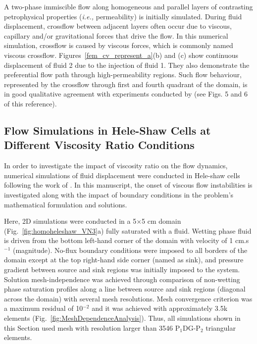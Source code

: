 \documentclass[preprint,authoryear,12pt]{elsarticle}
\newcommand{\PN}[2][error]{P$_{#1}$DG-P$_{#2}$}
\newcommand{\ie}{{\it i.e., }}
\begin{document}
A two-phase immiscible flow along homogeneous and parallel layers of contrasting petrophysical properties (\ie permeability) is initially simulated. During fluid displacement, crossflow between adjacent layers often occur due to viscous, capillary and/or gravitational forces that drive the flow. In this numerical simulation, crossflow is caused by viscous forces, which is commonly named viscous crossflow. Figures~\ref{fem_cv_represent_a}(b) and (c) show continuous displacement of fluid 2 due to the injection of fluid 1. They also demonstrate the preferential flow path through high-permeability regions. Such flow behaviour, represented by the crossflow through first and fourth quadrant of the domain, is in good qualitative agreement with experiments conducted by \citet{dawe_2008} (see Figs. 5 and 6 of this reference).  


\subsection{Flow Simulations in Hele-Shaw Cells at Different Viscosity Ratio Conditions}\label{section:results_homo_hete} 
In order to investigate the impact of viscosity ratio on the flow dynamics, numerical simulations of fluid displacement were conducted in Hele-shaw cells following the work of \citet{saffman_1986}. In this manuscript, the onset of viscous flow instabilities \citep[following his seminal work in][]{saffman_1958} is investigated along with the impact of boundary conditions in the problem's mathematical formulation and solutions. 

\medskip
Here, 2D simulations were conducted in a 5$\times$5 cm domain (Fig.~\ref{fig:homoheleshaw_VN3}a) fully saturated with a fluid. Wetting phase fluid is driven from the bottom left-hand corner of the domain with velocity of 1 cm.s$^{-1}$ (magnitude). No-flux boundary conditions were imposed to all borders of the domain except at the top right-hand side corner (named as sink), and pressure gradient between source and sink regions was initially imposed to the system. Solution mesh-independence was achieved through comparison of non-wetting phase saturation profiles along a line between source and sink regions (diagonal across the domain) with several mesh resolutions. Mesh convergence criterion was a maximum residual of 10$^{-2}$ and it was achieved with approximately 3.5k elements (Fig.~\ref{fig:MeshDependenceAnalysis}). Thus, all simulations shown in this Section used mesh with resolution larger than 3546 \PN[1]{2} triangular elements.
\end{document}
